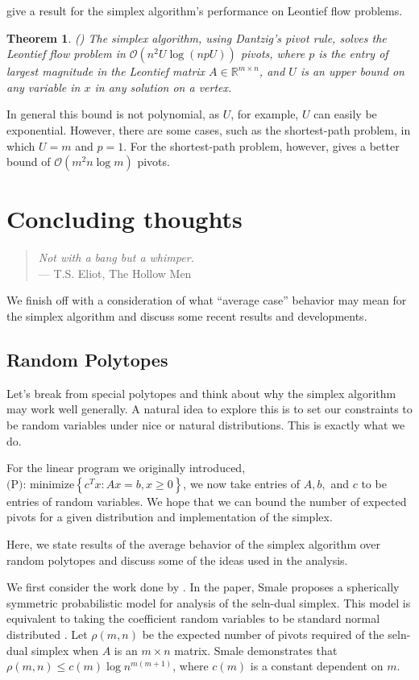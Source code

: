 \documentclass[11pt,a4paper]{article}
\newtheorem{thm}{Theorem}[section]
\theoremstyle{definition}
\begin{document}
\citet{ng96} give a result for the simplex algorithm's performance on Leontief flow problems.

\begin{thm}
{\rm (\citep{ng96})}
	The simplex algorithm, using Dantzig's pivot rule, solves the Leontief flow problem in $\mathcal{O}(n^2 U \log (npU))$ pivots, where $p$ is the entry of largest magnitude in the Leontief matrix $A\in\mathbb{R}^{m\times n}$, and $U$ is an upper bound on any variable in $x$ in any solution on a vertex.
\end{thm}

In general this bound is not polynomial, as $U$, for example, $U$ can easily be exponential. However, there are some cases, such as the shortest-path problem, in which $U=m$ and $p=1$. For the shortest-path problem, however, \citet{orlin85} gives a better bound of $\mathcal{O}(m^2 n\log m)$ pivots.

\section{Concluding thoughts}
\begin{quote}
\emph{Not with a bang but a whimper.}\\
	--- T.S. Eliot, The Hollow Men
\end{quote}

We finish off with a consideration of what ``average case'' behavior may mean for the simplex algorithm and discuss some recent results and developments.

\subsection{Random Polytopes}
Let's break from special polytopes and think about why the simplex algorithm may work well generally. A natural idea to explore this is to set our constraints to be random variables under nice or natural distributions. This is exactly what we do.

For the linear program we originally introduced, $\text{(P): minimize}\left\{ c^T x : Ax= b, x\ge 0\right\}$, we now take entries of $A, b,$ and $c$ to be entries of random variables. We hope that we can bound the number of expected pivots for a given distribution and implementation of the simplex.

Here, we state results of the average behavior of the simplex algorithm over random polytopes and discuss some of the ideas used in the analysis.

We first consider the work done by \citet{smale83}. In the paper, Smale proposes a spherically symmetric probabilistic model for analysis of the seln-dual simplex. This model is equivalent to taking the coefficient random variables to be standard normal distributed \citet{meg86}. Let $\rho(m,n)$ be the expected number of pivots required of the seln-dual simplex when $A$ is an $m\times n$ matrix. Smale demonstrates that $\rho(m,n)\le c(m)\log n^{m(m+1)}$, where $c(m)$ is a constant dependent on $m$. 
\end{document}
